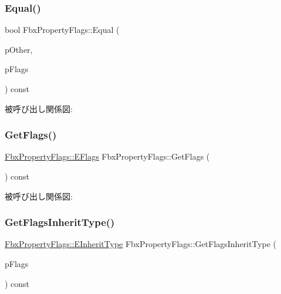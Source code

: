\mbox{\label{class_fbx_property_flags_a31bd65991f9d38027df4351e7c668a15}} 
\subsubsection{\texorpdfstring{Equal()}{Equal()}}
{\footnotesize\ttfamily bool Fbx\+Property\+Flags\+::\+Equal (\begin{DoxyParamCaption}\item[{const \hyperlink{class_fbx_property_flags}{Fbx\+Property\+Flags} \&}]{p\+Other,  }\item[{\hyperlink{class_fbx_property_flags_afabfa7e0949aac8a7dcdf8a141867e99}{Fbx\+Property\+Flags\+::\+E\+Flags}}]{p\+Flags }\end{DoxyParamCaption}) const}

被呼び出し関係図\+:
\mbox{\label{class_fbx_property_flags_aefc4769c28655bc2217756785bc83918}} 
\subsubsection{\texorpdfstring{Get\+Flags()}{GetFlags()}}
{\footnotesize\ttfamily \hyperlink{class_fbx_property_flags_afabfa7e0949aac8a7dcdf8a141867e99}{Fbx\+Property\+Flags\+::\+E\+Flags} Fbx\+Property\+Flags\+::\+Get\+Flags (\begin{DoxyParamCaption}{ }\end{DoxyParamCaption}) const}

被呼び出し関係図\+:
\mbox{\label{class_fbx_property_flags_a8cdb0c6b3dfb7986ce17eed144025e5a}} 
\subsubsection{\texorpdfstring{Get\+Flags\+Inherit\+Type()}{GetFlagsInheritType()}}
{\footnotesize\ttfamily \hyperlink{class_fbx_property_flags_ae3b667a4fcac4b827fa186a698fec2f8}{Fbx\+Property\+Flags\+::\+E\+Inherit\+Type} Fbx\+Property\+Flags\+::\+Get\+Flags\+Inherit\+Type (\begin{DoxyParamCaption}\item[{\hyperlink{class_fbx_property_flags_afabfa7e0949aac8a7dcdf8a141867e99}{Fbx\+Property\+Flags\+::\+E\+Flags}}]{p\+Flags }\end{DoxyParamCaption}) const}

